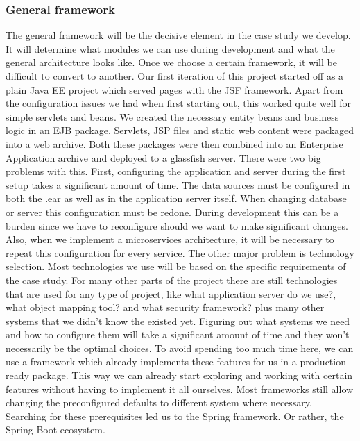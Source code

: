 \documentclass[12pt]{article}
\begin{document}
\begin{multicols}{2}
\subsubsection{General framework}
The general framework will be the decisive element in the case study we develop. It will determine what modules we can use during development and what the general architecture looks like. Once we choose a certain framework, it will be difficult to convert to another. Our first iteration of this project started off as a plain Java EE project which served pages with the JSF framework. Apart from the configuration issues we had when first starting out, this worked quite well for simple servlets and beans. We created the necessary entity beans and business logic in an EJB package. Servlets, JSP files and static web content were packaged into a web archive. Both these packages were then combined into an Enterprise Application archive and deployed to a glassfish server. There were two big problems with this. First, configuring the application and server during the first setup takes a significant amount of time. The data sources must be configured in both the .ear as well as in the application server itself. When changing database or server this configuration must be redone. During development this can be a burden since we have to reconfigure should we want to make significant changes. Also, when we implement a microservices architecture, it will be necessary to repeat this configuration for every service. The other major problem is technology selection. Most technologies we use will be based on the specific requirements of the case study. For many other parts of the project there are still technologies that are used for any type of project, like what application server do we use?, what object mapping tool? and what security framework? plus many other systems that we didn't know the existed yet. Figuring out what systems we need and how to configure them will take a significant amount of time and they won't necessarily be the optimal choices. To avoid spending too much time here, we can use a framework which already implements these features for us in a production ready package. This way we can already start exploring and working with certain features without having to implement it all ourselves. Most frameworks still allow changing the preconfigured defaults to different system where necessary. Searching for these prerequisites led us to the Spring framework. Or rather, the Spring Boot ecosystem. 
\\\\

\end{multicols}
\end{document}
